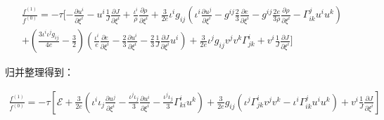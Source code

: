 \documentclass[MathematicsNumericsDerivationsAndOpenFOAM.tex]{subfiles}
\begin{document}
\begin{equation}
  \begin{gathered}
    \frac{f^{(1)}}{f^{(0)}}=
    -\tau [ -\frac{\partial u^i}{\partial \xi^i} -u^i \frac{1}{J} \frac{\partial J}{\partial \xi^i}  + \frac{\iota^i}{\rho} \frac{\partial \rho}{\partial \xi^i} +\frac{3}{2e}\iota^i g_{ij} (\iota^i \frac{\partial u^j}{\partial \xi^i}-g^{ij}\frac{2}{3}\frac{\partial e}{\partial \xi^i}-g^{ij}\frac{2e}{3\rho}\frac{\partial \rho}{\partial \xi^i}-\Gamma_{ik}^j u^iu^k) \\
    + (\frac{3 {\iota^i\iota^jg_{ij}}}{4e}-\frac{3}{2}) (\frac{\iota^i}{e}\frac{\partial e}{\partial \xi^i}-\frac{2}{3}\frac{\partial u^i}{\partial \xi^i}-\frac{2}{3}\frac{1}{J} \frac{\partial J}{\partial \xi^i}u^i) + \frac{3}{2e}\iota^j g_{ij} v^{j} v^{k} \Gamma_{j k}^{i} + v^i  \frac{1}{J}\frac{\partial J}{\partial \xi^i}
    ]
  \end{gathered}
\end{equation}






归并整理得到：


\begin{equation}
  \begin{gathered}
    \frac{f^{(1)}}{f^{(0)}}=
    -\tau [ \mathcal{E}
      +\frac{3}{2e}(\iota^i \iota_j \frac{\partial u^j}{\partial \xi^i} -\frac{\iota^j\iota_j}{3}\frac{\partial u^i}{\partial \xi^i}-\frac{\iota^j\iota_j}{3} \Gamma_{ki}^i u^k)
      + \frac{3}{2e} g_{ij} (\iota^j\Gamma_{j k}^{i} v^j v^k - \iota^i\Gamma_{i k}^{j} u^i u^k) + v^i  \frac{1}{J}\frac{\partial J}{\partial \xi^i}
    ]
  \end{gathered}
\end{equation}
\end{document}
